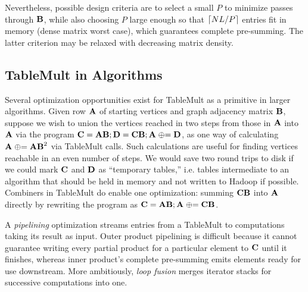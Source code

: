 Nevertheless, possible design criteria are to select a small $P$ to minimize passes through $\mathbf{B}$,
while also choosing $P$ large enough so that $\lceil NL/P\rceil$ entries fit in memory
(dense matrix worst case), which guarantees complete pre-summing.
The latter criterion may be relaxed with decreasing matrix density.


\subsection{TableMult in Algorithms}

Several optimization opportunities exist for TableMult as a primitive in larger algorithms.
Given row $\mathbf{A}$ of starting vertices and graph adjacency matrix $\mathbf{B}$, 
suppose we wish to union the vertices reached in two steps from those in $\mathbf{A}$ 
into $\mathbf{A}$ via the program
 $\mathbf{C} = \mathbf{AB}; \mathbf{D} = \mathbf{CB}; \mathbf{A} \mathrel{\oplus}= \mathbf{D}$,
as one way of calculating $\mathbf{A} \mathrel{\oplus}= \mathbf{AB}^2$ via TableMult calls.
Such calculations are useful for finding vertices reachable in an even number of steps.
We would save two round trips to disk if we could mark $\mathbf{C}$ and $\mathbf{D}$ as 
``temporary tables,'' i.e. tables intermediate to an algorithm that should be held in memory 
and not written to Hadoop if possible.
Combiners in TableMult do enable one optimization:
summing $\mathbf{CB}$ into $\mathbf{A}$ directly by rewriting the program as 
$\mathbf{C} = \mathbf{AB}; \mathbf{A} \mathrel{\oplus}= \mathbf{CB}$.

A \emph{pipelining} optimization streams entries from a TableMult 
to computations taking its result as input. 
Outer product pipelining is difficult
because it cannot guarantee writing every partial product for a particular element 
 to $\mathbf{C}$ until it finishes,
whereas inner product's complete pre-summing emits elements ready for use downstream.
More ambitiously, \emph{loop fusion} merges iterator stacks 
for successive computations into one. 


